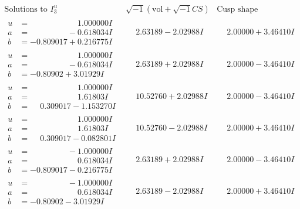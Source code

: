 \documentclass[1p]{elsarticle_modified}
\theoremstyle{definition}
\newcommand{\I}{\sqrt{-1}}
\begin{document}
$$\begin{array}{c|c|c}  
\text{Solutions to }I^u_{3}& \I (\text{vol} + \sqrt{-1}CS) & \text{Cusp shape}\\
 \hline 
\begin{aligned}
u &= \phantom{-0.000000 -}1.000000 I \\
a &= \phantom{-0.000000 } -0.618034 I \\
b &= -0.809017 + 0.216775 I\end{aligned}
 & \phantom{-}2.63189 - 2.02988 I & \phantom{-}2.00000 + 3.46410 I \\ \hline\begin{aligned}
u &= \phantom{-0.000000 -}1.000000 I \\
a &= \phantom{-0.000000 } -0.618034 I \\
b &= -0.80902 + 3.01929 I\end{aligned}
 & \phantom{-}2.63189 + 2.02988 I & \phantom{-}2.00000 - 3.46410 I \\ \hline\begin{aligned}
u &= \phantom{-0.000000 -}1.000000 I \\
a &= \phantom{-0.000000 -}1.61803 I \\
b &= \phantom{-}0.309017 - 1.153270 I\end{aligned}
 & \phantom{-}10.52760 + 2.02988 I & \phantom{-}2.00000 - 3.46410 I \\ \hline\begin{aligned}
u &= \phantom{-0.000000 -}1.000000 I \\
a &= \phantom{-0.000000 -}1.61803 I \\
b &= \phantom{-}0.309017 - 0.082801 I\end{aligned}
 & \phantom{-}10.52760 - 2.02988 I & \phantom{-}2.00000 + 3.46410 I \\ \hline\begin{aligned}
u &= \phantom{-0.000000 } -1.000000 I \\
a &= \phantom{-0.000000 -}0.618034 I \\
b &= -0.809017 - 0.216775 I\end{aligned}
 & \phantom{-}2.63189 + 2.02988 I & \phantom{-}2.00000 - 3.46410 I \\ \hline\begin{aligned}
u &= \phantom{-0.000000 } -1.000000 I \\
a &= \phantom{-0.000000 -}0.618034 I \\
b &= -0.80902 - 3.01929 I\end{aligned}
 & \phantom{-}2.63189 - 2.02988 I & \phantom{-}2.00000 + 3.46410 I \\ \hline\begin{aligned}

\end{aligned}
\end{array}$$
\end{document}
